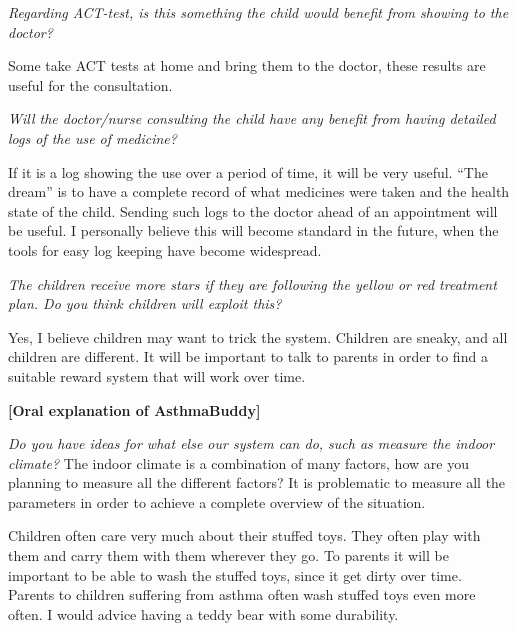 \emph{Regarding ACT-test, is this something the child would benefit from showing to the doctor?}

Some take ACT tests at home and bring them to the doctor, these results are useful for the consultation.

\emph{Will the doctor/nurse consulting the child have any benefit from having detailed logs of the use of medicine?}

If it is a log showing the use over a period of time, it will be very useful. ``The dream'' is to have a complete record of what medicines were taken and the health state of the child. Sending such logs to the doctor ahead of an appointment will be useful. I personally believe this will become standard in the future, when the tools for easy log keeping have become widespread.

\emph{The children receive more stars if they are following the yellow or red treatment plan. Do you think children will exploit this?} 

Yes, I believe children may want to trick the system. Children are sneaky, and all children are different. It will be important to talk to parents in order to find a suitable reward system that will work over time. 

\textbf{[Oral explanation of AsthmaBuddy]}

\emph{Do you have ideas for what else our system can do, such as measure the indoor climate?}
The indoor climate is a combination of many factors, how are you planning to measure all the different factors? It is problematic to measure all the parameters in order to achieve a complete overview of the situation. 

Children often care very much about their stuffed toys. They often play with them and carry them with them wherever they go. To parents it will be important to be able to wash the stuffed toys, since it get dirty over time. Parents to children suffering from asthma often wash stuffed toys even more often. I would advice having a teddy bear with some durability.
